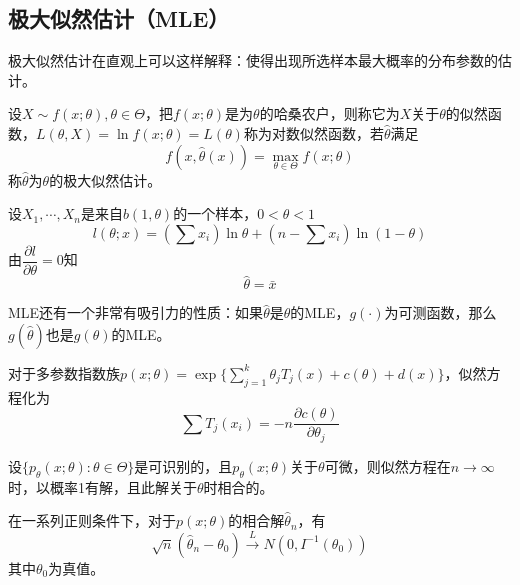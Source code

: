 \subsection{极大似然估计（MLE）}
极大似然估计在直观上可以这样解释：使得出现所选样本最大概率的分布参数的估计。
\begin{definition}
    设$X\sim f(x;\theta),\theta\in\Theta$，把$f(x;\theta)$是为$\theta$的哈桑农户，则称它为$X$关于$\theta$的似然函数，$L(\theta,X) = \ln f(x;\theta) = L(\theta)$称为对数似然函数，若$\hat{\theta}$满足
    \[
        f(x,\hat{\theta}(x)) = \max_{\theta\in\Theta}f(x;\theta)
    \]
    称$\hat{\theta}$为$\theta$的极大似然估计。
\end{definition}
\begin{example}
    设$X_1,\cdots,X_n$是来自$b(1,\theta)$的一个样本，$0<\theta<1$
    \[
        l(\theta;x) = \left( \sum x_i \right)\ln \theta + \left( n - \sum x_i \right)\ln (1-\theta) 
    \]
    由$\dfrac{\partial l}{\partial \theta} = 0$知
    \[
        \hat{\theta} = \bar{x}
    \]
\end{example}
\begin{remark}
    MLE还有一个非常有吸引力的性质：如果$\hat{\theta}$是$\theta$的MLE，$g(\cdot)$为可测函数，那么$g(\hat{\theta})$也是$g(\theta)$的MLE。

    对于多参数指数族$p(x;\theta) = \exp\{ \sum_{j = 1}^{k}\theta_jT_j(x)+c(\theta)+d(x) \}$，似然方程化为
    \[
        \sum T_{j}(x_i) = -n\dfrac{\partial c(\theta)}{\partial \theta_j}
    \]
\end{remark}
\begin{theorem}[MLE的相合性]
    设$\{ p_{\theta}(x;\theta):\theta\in\Theta \}$是可识别的，且$p_{\theta}(x;\theta)$关于$\theta$可微，则似然方程在$n\to \infty$时，以概率1有解，且此解关于$\theta$时相合的。
\end{theorem}
\begin{theorem}[MLE的渐进正态性]
    在一系列正则条件下，对于$p(x;\theta)$的相合解$\hat{\theta}_{n}$，有
    \[
        \sqrt{n}(\hat{\theta}_n-\theta_0)\overset{L}{\to}N(0,I^{-1}(\theta_0))
    \]
    其中$\theta_0$为真值。
\end{theorem}